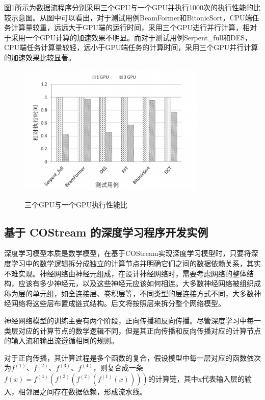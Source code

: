 图\ref{fig:3gpu-1gpu}所示为数据流程序分别采用三个GPU与一个GPU并执行1000次的执行性能的比较示意图。从图中可以看出，对于测试用例BeamFormer和BitonicSort，CPU端任务计算量较重，远远大于GPU端的运行时间，采用三个GPU进行并行计算，相对于采用一个GPU计算的加速效果不明显。而对于测试用例Serpent\_full和DES，CPU端任务计算量较轻，远小于GPU端任务的计算时间，采用三个GPU并行计算的加速效果比较显著。

\begin{figure}[htbp]
  \centering
  \includegraphics[width=0.8\textwidth]{Img/Chap_Application/Yu/3gpu-1gpu.png}\\
  \caption{三个GPU与一个GPU执行性能比}\label{fig:3gpu-1gpu}
\end{figure}

\subsection{基于 COStream 的深度学习程序开发实例}

深度学习模型本质是数学模型，在基于COStream实现深度学习模型时，只要将深度学习中的数学逻辑拆分成独立的计算节点并明确它们之间的数据依赖关系，其实不难实现。神经网络由神经元组成，在设计神经网络时，需要考虑网络的整体结构，应该有多少神经元，以及这些神经元应该如何相连。大多数神经网络被组织成称为层的单元组，如全连接层、卷积层等，不同类型的层连接方式不同，大多数神经网络将这些层布置成链式结构。后文将按照层来拆分整个网络模型。

神经网络模型的训练主要有两个阶段，正向传播和反向传播。尽管深度学习中每一类层对应的计算节点的数学逻辑不同，但是其正向传播和反向传播对应的计算节点的输入流和输出流遵循相同的规则。

对于正向传播，其计算过程是多个函数的复合，假设模型中每一层对应的函数依次为$f^{\left (1 \right )}$、$f^{\left (2 \right )}$、$f^{\left (3 \right )}$、$f^{\left (4 \right )}$，则复合成一条$f\left ( x \right )= f^{\left (4 \right )}\left ( f^{\left (3 \right )}\left ( f^{\left (2 \right )}\left ( f^{\left (1 \right )}\left ( x \right ) \right ) \right ) \right )$的计算链，其中x代表输入层的输入，相邻层之间存在数据依赖，形成流水线。

